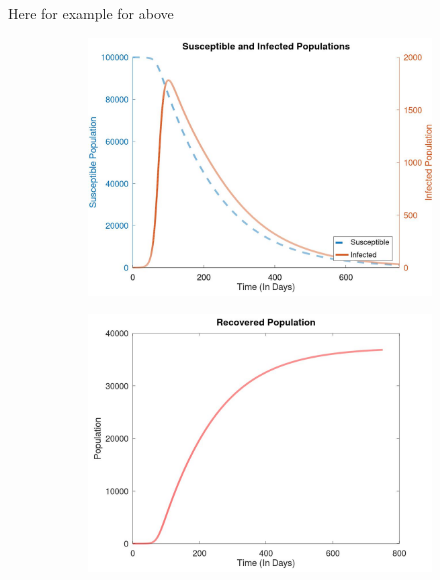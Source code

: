 \documentclass [letterpaper, 12pt] {article}
\begin{document}
Here for example for above
\begin{figure}[h!]
	\begin{subfigure}{0.48\textwidth}
	\includegraphics[width=\linewidth]{Figures/bubonic750.jpg}
	\end{subfigure}\hspace{\fill}
	\begin{subfigure}{0.48\textwidth}
	\includegraphics[width=\linewidth]{Figures/bubonicr.jpg}
	\end{subfigure}
	\begin{subfigure}{0.48\textwidth}

\end{subfigure}
\end{figure}
\end{document}
